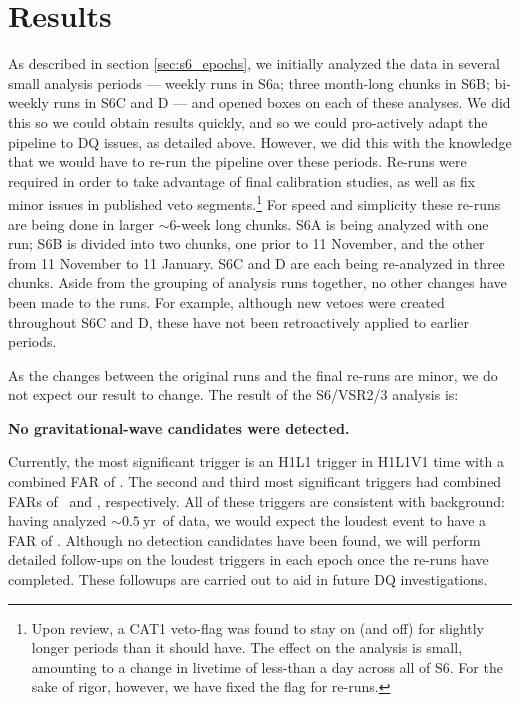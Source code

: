 \section{Results}

As described in section \ref{sec:s6_epochs}, we initially analyzed the data in several small analysis periods --- weekly runs in S6a; three month-long chunks in S6B; bi-weekly runs in S6C and D --- and opened boxes on each of these analyses. We did this so we could obtain results quickly, and so we could pro-actively adapt the pipeline to \ac{DQ} issues, as detailed above. However, we did this with the knowledge that we would have to re-run the pipeline over these periods. Re-runs were required in order to take advantage of final calibration studies, as well as fix minor issues in published veto segments.\footnote{Upon review, a CAT1 veto-flag was found to stay on (and off) for slightly longer periods than it should have. The effect on the analysis is small, amounting to a change in livetime of less-than a day across all of S6. For the sake of rigor, however, we have fixed the flag for re-runs.} For speed and simplicity these re-runs are being done in larger $\sim6$-week long chunks. S6A is being analyzed with one run; S6B is divided into two chunks, one prior to 11 November, and the other from 11 November to 11 January. S6C and D are each being re-analyzed in three chunks. Aside from the grouping of analysis runs together, no other changes have been made to the runs. For example, although new vetoes were created throughout S6C and D, these have not been retroactively applied to earlier periods.

As the changes between the original runs and the final re-runs are minor, we do not expect our result to change. The result of the S6/VSR2/3 analysis is:
\begin{center}
\textbf{No gravitational-wave candidates were detected.}
\end{center}
Currently, the most significant trigger is an H1L1 trigger in H1L1V1 time with a
combined FAR of \firstFAR. The second and third most significant triggers had
combined FARs of \secondFAR~and \thirdFAR, respectively. All of these triggers
are consistent with background: having analyzed
$\mathrm{\sim0.5~yr}$~of data, we would expect the loudest event to
have a FAR of \expectedLoudestFAR. Although no detection candidates have been found,
 we will perform detailed follow-ups on the loudest triggers in each epoch once the re-runs have completed. These followups are carried out to aid in future \ac{DQ} investigations.

